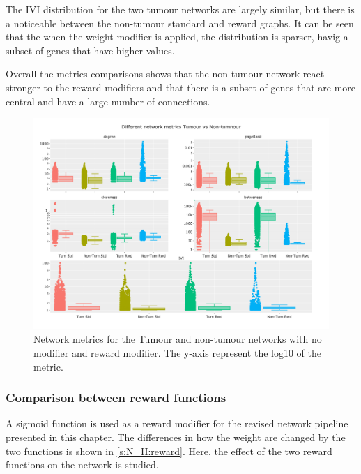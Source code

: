 The IVI distribution for the two tumour networks are largely similar, but there is a noticeable between the non-tumour standard and reward graphs. It can be seen that the when the weight modifier is applied, the distribution is sparser, havig a subset of genes that have higher values.

Overall the metrics comparisons shows that the non-tumour network react stronger to the reward modifiers and that there is a subset of genes that are more central and have a large number of connections.

\begin{figure}[H]    
    \centering
    \includegraphics[width=1.0\textwidth,height=0.7\textheight,keepaspectratio]{Sections/Network_II/validation/network_comparison.png}
    \caption{Network metrics for the Tumour and non-tumour networks with no modifier and reward modifier. The y-axis represent the log10 of the metric. }
    \label{fig:N_II:net_metrics_comp}
\end{figure}


\subsubsection{Comparison between reward functions} \label{s:N_II:reward_comp}



A sigmoid function is used as a reward modifier for the revised network pipeline presented in this chapter. The differences in how the weight are changed by the two functions is shown in \cref{s:N_II:reward}. Here, the effect of the two reward functions on the network is studied.

